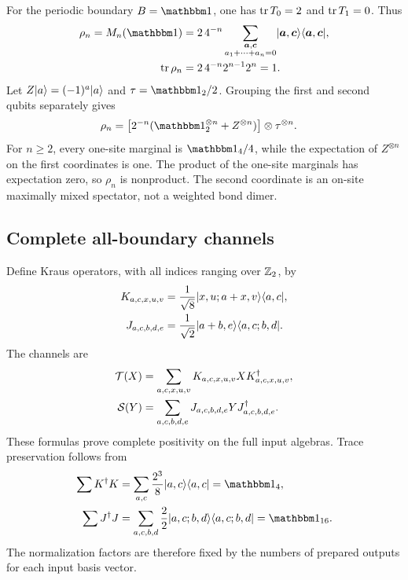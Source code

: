 \documentclass[aps,pra,reprint,nofootinbib,onecolumn]{revtex4-2}
\begin{document}
For the periodic boundary $B=\Id$, one has
$\operatorname{tr} T_0=2$ and $\operatorname{tr} T_1=0$. Thus
\begin{align}
	\rho_n=M_n(\Id)
	          & =2\,4^{-n}
	\sum_{\substack{\boldsymbol a,\boldsymbol c\\
			a_1+\cdots+a_n=0}}
	\ket{\boldsymbol a,\boldsymbol c}
	\bra{\boldsymbol a,\boldsymbol c},
	\\
	\tr\rho_n & =2\,4^{-n}2^{n-1}2^n=1.
\end{align}
Let $Z\lvert a\rangle=(-1)^a\lvert a\rangle$ and $\tau=\Id_2/2$. Grouping the first
and second qubits separately gives
\begin{align}
	\rho_n
	 & =\left[2^{-n}(\Id_2^{\otimes n}+Z^{\otimes n})\right]
	\otimes\tau^{\otimes n}.
	\label{eq:parity}
\end{align}
For $n\geq2$, every one-site marginal is $\Id_4/4$, while the
expectation of $Z^{\otimes n}$ on the first coordinates is one.
The product of the one-site marginals has expectation zero, so
$\rho_n$ is nonproduct. The second coordinate is an on-site
maximally mixed spectator, not a weighted bond dimer.

\subsection{Complete all-boundary channels}

Define Kraus operators, with all indices ranging over $\mathbb{Z}_2$, by
\begin{align}
	K_{a,c,x,u,v}
	 & =\frac1{\sqrt8}
	\lvert x,u;a+x,v\rangle\langle a,c\rvert,
	\\
	J_{a,c,b,d,e}
	 & =\frac1{\sqrt2}\lvert a+b,e\rangle\langle a,c;b,d\rvert.
\end{align}
The channels are
\begin{align}
	\mathcal{T}(X) & =\sum_{a,c,x,u,v}K_{a,c,x,u,v}XK_{a,c,x,u,v}^\dagger,
	\\
	\mathcal{S}(Y) & =\sum_{a,c,b,d,e}J_{a,c,b,d,e}YJ_{a,c,b,d,e}^\dagger.
\end{align}
These formulas prove complete positivity on the full input algebras.
Trace preservation follows from
\begin{align}
	\sum K^\dagger K
	 & =\sum_{a,c}\frac{2^3}{8}\ket{a,c}\bra{a,c}=\Id_4,
	\\
	\sum J^\dagger J
	 & =\sum_{a,c,b,d}\frac22
	\ket{a,c;b,d}\bra{a,c;b,d}=\Id_{16}.
\end{align}
The normalization factors are therefore fixed by the numbers of
prepared outputs for each input basis vector.
\end{document}
